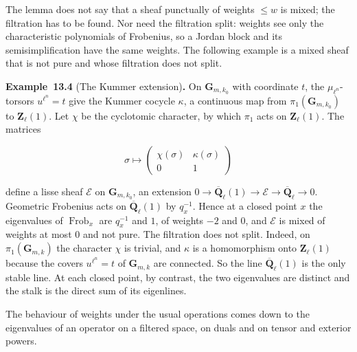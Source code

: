 \documentclass[11pt]{article}
\newenvironment{bpstatement}[2]{\par\addvspace{0.6\baselineskip}\noindent\textbf{#1}#2\textbf{.}\enspace\ignorespaces}
  {\par\addvspace{0.4\baselineskip}}
\begin{document}
\label{bp16}%
The lemma does not say that a sheaf punctually of weights \(\le w\) is mixed; the filtration has to be found. Nor need the filtration split: weights see only the characteristic polynomials of Frobenius, so a Jordan block and its semisimplification have the same weights. The following example is a mixed sheaf that is not pure and whose filtration does not split.

\label{bp17}%
\begin{bpstatement}{Example~13.4}{ (The Kummer extension)}
On \(\mathbf G_{m,k_0}\) with coordinate \(t\), the \(\mu_{\ell^n}\)-torsors \(u^{\ell^n}=t\) give the Kummer cocycle \(\kappa\), a continuous map from \(\pi_1(\mathbf G_{m,k_0})\) to \(\mathbf Z_\ell(1)\). Let \(\chi\) be the cyclotomic character, by which \(\pi_1\) acts on \(\mathbf Z_\ell(1)\). The matrices

\[
\sigma\longmapsto\begin{pmatrix}\chi(\sigma)&\kappa(\sigma)\\0&1\end{pmatrix}
\]

define a lisse sheaf \(\mathcal E\) on \(\mathbf G_{m,k_0}\), an extension \(0\to\overline{\mathbf Q}_\ell(1)\to\mathcal E\to\overline{\mathbf Q}_\ell\to0\). Geometric Frobenius acts on \(\overline{\mathbf Q}_\ell(1)\) by \(q_x^{-1}\). Hence at a closed point \(x\) the eigenvalues of \(\operatorname{Frob}_x\) are \(q_x^{-1}\) and \(1\), of weights \(-2\) and \(0\), and \(\mathcal E\) is mixed of weights at most \(0\) and not pure. The filtration does not split. Indeed, on \(\pi_1(\mathbf G_{m,k})\) the character \(\chi\) is trivial, and \(\kappa\) is a homomorphism onto \(\mathbf Z_\ell(1)\) because the covers \(u^{\ell^n}=t\) of \(\mathbf G_{m,k}\) are connected. So the line \(\overline{\mathbf Q}_\ell(1)\) is the only stable line. At each closed point, by contrast, the two eigenvalues are distinct and the stalk is the direct sum of its eigenlines.
\end{bpstatement}

\label{bp18}%
The behaviour of weights under the usual operations comes down to the eigenvalues of an operator on a filtered space, on duals and on tensor and exterior powers.
\end{document}
